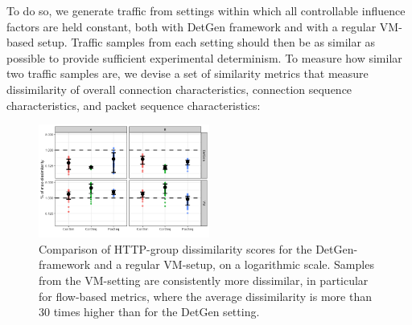 \documentclass[runningheads]{llncs}
\begin{document}
To do so, we generate traffic from settings within which all controllable influence factors are held constant, both with DetGen framework and with a regular VM-based setup. Traffic samples from each setting should then be as similar as possible to provide sufficient experimental determinism. To measure how similar two traffic samples are, we devise a set of similarity metrics that measure dissimilarity of overall connection characteristics, connection sequence characteristics, and packet sequence characteristics:


\begin{figure}
\centering
\includegraphics[width=0.5\textwidth]{images/Exp1.png}
\caption{Comparison of HTTP-group dissimilarity scores for the DetGen-framework and a regular VM-setup, on a logarithmic scale. Samples from the VM-setting are consistently more dissimilar, in particular for flow-based metrics, where the average dissimilarity is more than 30 times higher than for the DetGen setting.}\label{Fig:determ-metric}
\end{figure}




\end{document}

